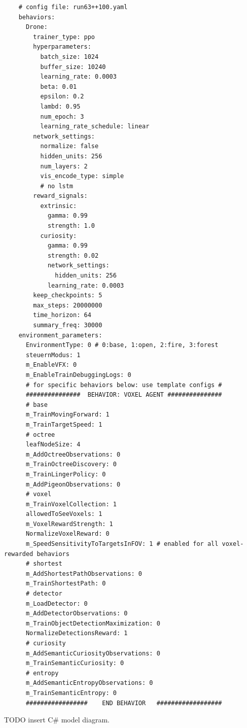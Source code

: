 \begin{verbatim}
    # config file: run63++100.yaml
    behaviors:
      Drone:
        trainer_type: ppo
        hyperparameters:
          batch_size: 1024
          buffer_size: 10240
          learning_rate: 0.0003
          beta: 0.01
          epsilon: 0.2
          lambd: 0.95
          num_epoch: 3
          learning_rate_schedule: linear
        network_settings:
          normalize: false
          hidden_units: 256
          num_layers: 2
          vis_encode_type: simple
          # no lstm
        reward_signals:
          extrinsic:
            gamma: 0.99
            strength: 1.0
          curiosity:
            gamma: 0.99
            strength: 0.02
            network_settings:
              hidden_units: 256
            learning_rate: 0.0003
        keep_checkpoints: 5
        max_steps: 20000000
        time_horizon: 64
        summary_freq: 30000
    environment_parameters:
      EnvironmentType: 0 # 0:base, 1:open, 2:fire, 3:forest
      steuernModus: 1
      m_EnableVFX: 0
      m_EnableTrainDebuggingLogs: 0
      # for specific behaviors below: use template configs #
      ###############  BEHAVIOR: VOXEL AGENT ###############
      # base
      m_TrainMovingForward: 1
      m_TrainTargetSpeed: 1
      # octree
      leafNodeSize: 4
      m_AddOctreeObservations: 0
      m_TrainOctreeDiscovery: 0
      m_TrainLingerPolicy: 0
      m_AddPigeonObservations: 0
      # voxel
      m_TrainVoxelCollection: 1
      allowedToSeeVoxels: 1
      m_VoxelRewardStrength: 1
      NormalizeVoxelReward: 0 
      m_SpeedSensitivityToTargetsInFOV: 1 # enabled for all voxel-rewarded behaviors
      # shortest
      m_AddShortestPathObservations: 0
      m_TrainShortestPath: 0
      # detector
      m_LoadDetector: 0
      m_AddDetectorObservations: 0
      m_TrainObjectDetectionMaximization: 0
      NormalizeDetectionsReward: 1
      # curiosity
      m_AddSemanticCuriosityObservations: 0
      m_TrainSemanticCuriosity: 0
      # entropy
      m_AddSemanticEntropyObservations: 0
      m_TrainSemanticEntropy: 0
      #################    END BEHAVIOR   ##################
\end{verbatim}



TODO\: insert C# model diagram.

